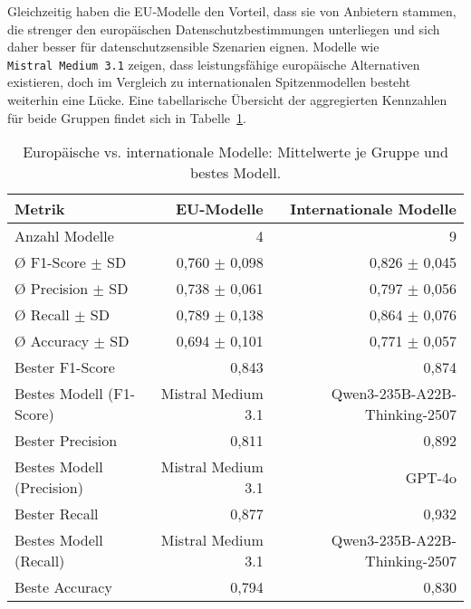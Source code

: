 Gleichzeitig haben die EU‑Modelle den Vorteil, dass sie von Anbietern stammen, die strenger den europäischen Datenschutzbestimmungen unterliegen und sich daher besser für datenschutzsensible Szenarien eignen. Modelle wie \texttt{Mistral\linebreak~Medium 3.1} zeigen, dass leistungsfähige europäische Alternativen existieren, doch im Vergleich zu internationalen Spitzenmodellen besteht weiterhin eine Lücke. Eine tabellarische Übersicht der aggregierten Kennzahlen für beide Gruppen findet sich in Tabelle~\ref{tab:eu-vs-international}.

\begin{table}[htbp]
 \centering
 \caption{Europäische vs. internationale Modelle: Mittelwerte je Gruppe und bestes Modell.}
 \label{tab:eu-vs-international}
 \begin{adjustbox}{width=\textwidth}
  \begin{threeparttable}[width=\textwidth]
   \begin{tabular}[width=\textwidth]{l r r}
    \toprule
    \textbf{Metrik} & \textbf{\ac{EU}-Modelle} & \textbf{Internationale Modelle} \\
    \midrule
    Anzahl Modelle              & 4                           & 9 \\
    Ø F1-Score $\pm$ SD         & 0{,}760 $\pm$ 0{,}098       & 0{,}826 $\pm$ 0{,}045 \\
    Ø Precision $\pm$ SD        & 0{,}738 $\pm$ 0{,}061       & 0{,}797 $\pm$ 0{,}056 \\
    Ø Recall $\pm$ SD           & 0{,}789 $\pm$ 0{,}138       & 0{,}864 $\pm$ 0{,}076 \\
    Ø Accuracy $\pm$ SD         & 0{,}694 $\pm$ 0{,}101       & 0{,}771 $\pm$ 0{,}057 \\
    Bester F1-Score             & 0{,}843                     & 0{,}874 \\
    Bestes Modell (F1-Score)    & Mistral Medium 3.1          & Qwen3-235B-A22B-Thinking-2507 \\
    Bester Precision            & 0{,}811                     & 0{,}892 \\
    Bestes Modell (Precision)   & Mistral Medium 3.1          & GPT-4o \\
    Bester Recall               & 0{,}877                     & 0{,}932 \\
    Bestes Modell (Recall)      & Mistral Medium 3.1          & Qwen3-235B-A22B-Thinking-2507 \\
    Beste Accuracy              & 0{,}794                     & 0{,}830 \\

\end{tabular}
\end{threeparttable}
\end{adjustbox}
\end{table}
